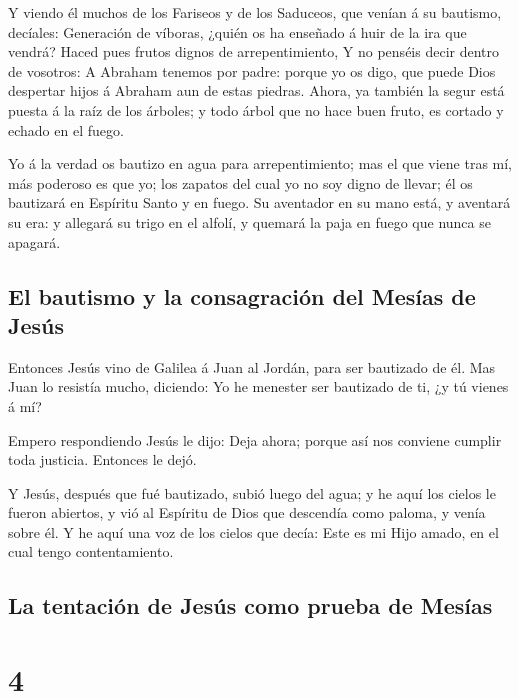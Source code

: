  Y viendo él muchos de los Fariseos y de los Saduceos, que
venían á su bautismo, decíales: Generación de víboras, ¿quién os ha
enseñado á huir de la ira que vendrá?  Haced pues frutos
dignos de arrepentimiento,  Y no penséis decir dentro de
vosotros: A Abraham tenemos por padre: porque yo os digo, que puede Dios
despertar hijos á Abraham aun de estas piedras.  Ahora,
ya también la segur está puesta á la raíz de los árboles; y todo árbol
que no hace buen fruto, es cortado y echado en el fuego.

 Yo á la verdad os bautizo en agua para arrepentimiento;
mas el que viene tras mí, más poderoso es que yo; los zapatos del cual
yo no soy digno de llevar; él os bautizará en Espíritu Santo y en fuego.
 Su aventador en su mano está, y aventará su era: y
allegará su trigo en el alfolí, y quemará la paja en fuego que nunca se
apagará.

\hypertarget{el-bautismo-y-la-consagraciuxf3n-del-mesuxedas-de-jesuxfas}{%
\subsection{El bautismo y la consagración del Mesías de
Jesús}\label{el-bautismo-y-la-consagraciuxf3n-del-mesuxedas-de-jesuxfas}}

 Entonces Jesús vino de Galilea á Juan al Jordán, para
ser bautizado de él.  Mas Juan lo resistía mucho,
diciendo: Yo he menester ser bautizado de ti, ¿y tú vienes á mí?

 Empero respondiendo Jesús le dijo: Deja ahora; porque
así nos conviene cumplir toda justicia. Entonces le dejó.

 Y Jesús, después que fué bautizado, subió luego del
agua; y he aquí los cielos le fueron abiertos, y vió al Espíritu de Dios
que descendía como paloma, y venía sobre él.  Y he aquí
una voz de los cielos que decía: Este es mi Hijo amado, en el cual tengo
contentamiento.

\hypertarget{la-tentaciuxf3n-de-jesuxfas-como-prueba-de-mesuxedas}{%
\subsection{La tentación de Jesús como prueba de
Mesías}\label{la-tentaciuxf3n-de-jesuxfas-como-prueba-de-mesuxedas}}

\hypertarget{section-40-4}{%
\section{4}\label{section-40-4}}

